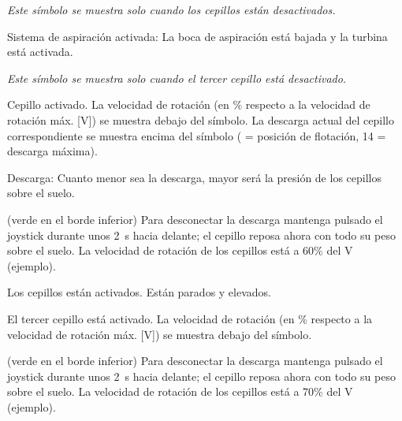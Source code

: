
{\em Este símbolo se muestra solo cuando los cepillos están desactivados.}

\startSymVpad
{}
\SymVpad
{} Sistema de aspiración activada:
La boca de aspiración está bajada y la turbina está activada.
\stopSymVpad



{\em Este símbolo se muestra solo cuando el tercer cepillo está desactivado.}

\startSymVpad
{}
\SymVpad
{} Cepillo activado. La velocidad de rotación (en \% respecto a la velocidad de rotación máx. [V]) se muestra debajo del símbolo. La descarga actual del cepillo correspondiente se muestra encima del símbolo (\type{ } = posición de flotación, 14 = descarga máxima).

{\md Descarga:} {\lt Cuanto menor sea la descarga, mayor será la presión de los cepillos sobre el suelo.}
\stopSymVpad


\startSymVpad
{}
\SymVpad
{}(verde en el borde inferior)
Para desconectar la descarga mantenga pulsado el joystick durante unos 2 s hacia delante; el cepillo reposa ahora con todo su peso sobre el suelo. La velocidad de rotación de los cepillos está a 60\hairspace\% del V (ejemplo).
\stopSymVpad

\startSymVpad
{}
\SymVpad
{} Los cepillos están activados. Están parados y elevados.
\stopSymVpad



\startSymVpad
{}
\SymVpad
{} El tercer cepillo está activado. La velocidad de rotación (en \% respecto a la velocidad de rotación máx. [V]) se muestra debajo del símbolo.
\stopSymVpad


\startSymVpad
{}
\SymVpad
{}(verde en el borde inferior)
Para desconectar la descarga mantenga pulsado el joystick durante unos 2 s hacia delante; el cepillo reposa ahora con todo su peso sobre el suelo. La velocidad de rotación de los cepillos está a 70\hairspace\% del V (ejemplo).

